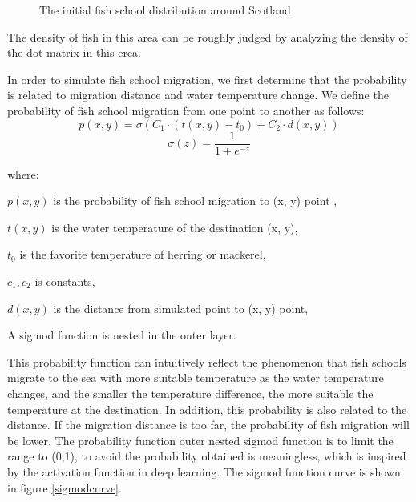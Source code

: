 \documentclass{mcmthesis}
\numberwithin{figure}{section}
\numberwithin{table}{section}
\begin{document}
\begin{figure}[H]
  \caption{The initial fish school distribution around Scotland}\label{InitDist}
\end{figure}

The density of fish in this area can be roughly judged by analyzing the density of the dot matrix in this erea.

In order to simulate fish school migration, we first determine that the probability is related to migration distance and water temperature change. We define the probability of fish school migration from one point to another as follows:
\begin{equation}\label{3}
      p(x,y) = \sigma (C_1 \cdot (t(x,y)-t_0)+C_2 \cdot d(x,y))
    \end{equation}
  \begin{equation}\label{4}
    \sigma (z) = \frac{1}{1+e^{-z}}
  \end{equation}
 
  where:
  
  $p(x,y)$ is the probability of fish school migration to (x, y) point ,
  
  $t(x,y)$ is the water temperature of the destination (x, y), 
  
  $t_0$ is the favorite temperature of herring or mackerel,
  
  $c_1,c_2$ is constants, 
  
  $d(x,y)$ is the distance from simulated point to (x, y) point, 
  
  A sigmod function is nested in the outer layer.
  
  This probability function can intuitively reflect the phenomenon that fish schools migrate to the sea with more suitable temperature as the water temperature changes, and the smaller the temperature difference, the more suitable the temperature at the destination. In addition, this probability is also related to the distance. If the migration distance is too far, the probability of fish migration will be lower. The probability function outer nested sigmod function is to limit the range to (0,1), to avoid the probability obtained is meaningless, which is inspired by the activation function in deep learning. The sigmod function curve is shown in figure \ref{sigmodcurve}.
\end{document}
